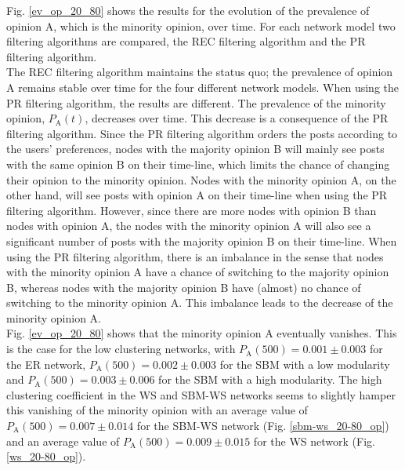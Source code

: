 \documentclass[11 pt , letterpaper , twoside , openright]{book}
\begin{document}
\newline
Fig. \ref{ev_op_20_80} shows the results for the evolution of the prevalence of opinion A, which is the minority opinion, over time. For each network model two filtering algorithms are compared, the REC filtering algorithm and the PR filtering algorithm. \\
\newline
The REC filtering algorithm maintains the status quo; the prevalence of opinion A remains stable over time for the four different network models. When using the PR filtering algorithm, the results are different. The prevalence of the minority opinion, $P_\text{A}(t)$, decreases over time. This decrease is a consequence of the PR filtering algorithm. Since the PR filtering algorithm orders the posts according to the users' preferences, nodes with the majority opinion B will mainly see posts with the same opinion B on their time-line, which limits the chance of changing their opinion to the minority opinion. Nodes with the minority opinion A, on the other hand, will see posts with opinion A on their time-line when using the PR filtering algorithm. However, since there are more nodes with opinion B than nodes with opinion A, the nodes with the minority opinion A will also see a significant number of posts with the majority opinion B on their time-line. When using the PR filtering algorithm, there is an imbalance in the sense that nodes with the minority opinion A have a chance of switching to the majority opinion B, whereas nodes with the majority opinion B have (almost) no chance of switching to the minority opinion A. This imbalance leads to the decrease of the minority opinion A.\\
\newline
Fig. \ref{ev_op_20_80} shows that the minority opinion A eventually vanishes. This is the case for the low clustering networks, with $P_\text{A}(500) = 0.001 \pm 0.003$ for the ER network, $P_\text{A}(500) = 0.002 \pm 0.003$ for the SBM with a low modularity and $P_\text{A}(500) = 0.003 \pm 0.006$ for the SBM with a high modularity. The high clustering coefficient in the WS and SBM-WS networks seems to slightly hamper this vanishing of the minority opinion with an average value of $P_\text{A}(500) = 0.007 \pm 0.014$ for the SBM-WS network (Fig. \ref{sbm-ws_20-80_op}) and an average value of $P_\text{A}(500) = 0.009 \pm 0.015$ for the WS network (Fig. \ref{ws_20-80_op}).\\ 
\newline
\end{document}
